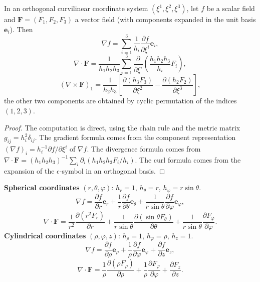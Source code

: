 \begin{proposition}\label{prop:curvilinear_operators}
In an orthogonal curvilinear coordinate system $(\xi^1,\xi^2,\xi^3)$, let $f$ be a scalar field and $\mathbf F=(F_1,F_2,F_3)$ a vector field (with components expanded in the unit basis $\mathbf e_i$). Then
\[
\nabla f = \sum_{i=1}^3 \frac{1}{h_i}\frac{\partial f}{\partial\xi^i}\mathbf e_i,
\]
\[
\nabla\cdot\mathbf F = \frac{1}{h_1h_2h_3}\sum_{i=1}^3 \frac{\partial}{\partial\xi^i}\left(\frac{h_1h_2h_3}{h_i}F_i\right),
\]
\[
(\nabla\times\mathbf F)_1 = \frac{1}{h_2h_3}\left[\frac{\partial(h_3F_3)}{\partial\xi^2}-\frac{\partial(h_2F_2)}{\partial\xi^3}\right],
\]
the other two components are obtained by cyclic permutation of the indices $(1,2,3)$.
\end{proposition}

\begin{proof}
The computation is direct, using the chain rule and the metric matrix $g_{ij} = h_i^2\delta_{ij}$. The gradient formula comes from the component representation $(\nabla f)_i = h_i^{-1}\partial f/\partial\xi^i$ of $\nabla f$. The divergence formula comes from $\nabla\cdot\mathbf F = (h_1h_2h_3)^{-1}\sum_i\partial_i(h_1h_2h_3 F_i/h_i)$. The curl formula comes from the expansion of the $\epsilon$-symbol in an orthogonal basis.
\end{proof}

\begin{example}\label{ex:spherical_cylindrical}
\textbf{Spherical coordinates} $(r,\theta,\varphi)$: $h_r=1$, $h_\theta=r$, $h_\varphi=r\sin\theta$.
\[
\nabla f = \frac{\partial f}{\partial r}\mathbf e_r + \frac{1}{r}\frac{\partial f}{\partial\theta}\mathbf e_\theta + \frac{1}{r\sin\theta}\frac{\partial f}{\partial\varphi}\mathbf e_\varphi,
\]
\[
\nabla\cdot\mathbf F = \frac{1}{r^2}\frac{\partial(r^2F_r)}{\partial r} + \frac{1}{r\sin\theta}\frac{\partial(\sin\theta F_\theta)}{\partial\theta} + \frac{1}{r\sin\theta}\frac{\partial F_\varphi}{\partial\varphi}.
\]
\textbf{Cylindrical coordinates} $(\rho,\varphi,z)$: $h_\rho=1$, $h_\varphi=\rho$, $h_z=1$.
\[
\nabla f = \frac{\partial f}{\partial\rho}\mathbf e_\rho + \frac{1}{\rho}\frac{\partial f}{\partial\varphi}\mathbf e_\varphi + \frac{\partial f}{\partial z}\mathbf e_z,
\]
\[
\nabla\cdot\mathbf F = \frac{1}{\rho}\frac{\partial(\rho F_\rho)}{\partial\rho} + \frac{1}{\rho}\frac{\partial F_\varphi}{\partial\varphi} + \frac{\partial F_z}{\partial z}.
\]
\end{example}

